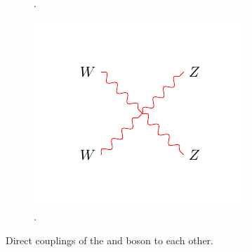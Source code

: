 \begin{figure}[htbp]
\begin{subfigure}{0.3\textwidth}
    \caption{\HepProcess{\PW\PW\PW\PW}.}
    \label{fig:weak_WWWW}
  \end{subfigure}
  \begin{subfigure}{0.3\textwidth}
    \centering
    \includegraphics[width=\textwidth]{weak_WWZZ}
    \caption{\HepProcess{\PW\PW\PZ\PZ}.}
    \label{fig:weak_WWZZ}
  \end{subfigure}
  \caption{Direct couplings of the \PW and \PZ boson to each other.}
  \label{fig:weak_boson}
\end{figure}

